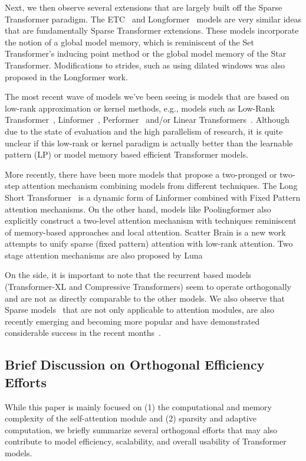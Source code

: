 Next, we then observe several extensions that are largely built off the Sparse Transformer paradigm. The ETC~\citep{ainslie2020etc} and Longformer~\citep{beltagy2020longformer} models are very similar ideas that are fundamentally Sparse Transformer extensions. These models incorporate the notion of a global model memory, which is reminiscent of the Set Transformer's inducing point method or the global model memory of the Star Transformer. Modifications to strides, such as using dilated windows was also proposed in the Longformer work.

The most recent wave of models we've been seeing is models that are based on low-rank approximation or kernel methods, e.g., models such as Low-Rank Transformer~\citep{winata2020lightweight}, Linformer~\citep{wang2020linformer}, Performer~\citep{choromanski2020masked} and/or Linear Transformers~\citep{katharopoulos2020transformers}. Although due to the state of evaluation and the high parallelism of research, it is quite unclear if this low-rank or kernel paradigm is actually better than the learnable pattern (LP) or model memory based efficient Transformer models.  

More recently, there have been more models that propose a two-pronged or two-step attention mechanism combining models from different techniques. The Long Short Transformer~\citep{zhu2021long} is a dynamic form of Linformer combined with Fixed Pattern attention mechanisms. On the other hand, models like Poolingformer also explicitly construct a two-level attention mechanism with techniques reminiscent of memory-based approaches and local attention. Scatter Brain is a new work~\citep{chen2021scatterbrain} attempts to unify sparse (fixed pattern) attention with low-rank attention. Two stage attention mechanisms are also proposed by Luna~\citep{ma2021luna}

On the side, it is important to note that the recurrent based models (Transformer-XL and Compressive Transformers) seem to operate orthogonally and are not as directly comparable to the other models. We also observe that Sparse models~\citep{lepikhin2020gshard,fedus2021switch} that are not only applicable to attention modules, are also recently emerging and becoming more popular and have demonstrated considerable success in the recent months~\citep{du2021glam}.

\subsection{Brief Discussion on Orthogonal Efficiency Efforts} While this paper is mainly focused on (1) the computational and memory complexity of the self-attention module and (2) sparsity and adaptive computation, we briefly summarize several orthogonal efforts that may also contribute to model efficiency, scalability, and overall usability of Transformer models.

